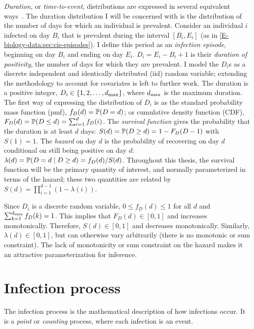 \documentclass[thesis.tex]{subfiles}
\begin{document}
\emph{Duration}, or \emph{time-to-event}, distributions are expressed in several equivalent ways~\autocite[17]{sunStatisticala}.
The duration distribution I will be concerned with is the distribution of the number of days for which an individual is prevalent.
Consider an individual $i$ infected on day $B_i$ that is prevalent during the interval $[B_i, E_i]$ (as in \cref{E-biology-data:sec:cis-episodes}).
I define this period as an \emph{infection episode}, beginning on day $B_i$ and ending on day $E_i$.
$D_i = E_i - B_i + 1$ is their \emph{duration of positivity}, the number of days for which they are prevalent.
I model the $D_i$s as a discrete independent and identically distributed (iid) random variable; extending the methodology to account for covariates is left to further work.
The duration is a positive integer, \ie $D_i \in \{1, 2, \dots, d_\text{max} \}$, where $d_\text{max}$ is the maximum duration.
The first way of expressing the distribution of $D_i$ is as the standard probability mass function (pmf), $f_{D}(d) = \operatorname{\mathbb{P}}(D = d)$; or cumulative density function (CDF), $F_{D}(d) = \operatorname{\mathbb{P}}(D \leq d) = \sum_{i=1}^d f_{D}(i)$.
The \emph{survival function} gives the probability that the duration is at least $d$ days: $S(d) = \operatorname{\mathbb{P}}(D \geq d) = 1 - F_{D}(D - 1)$ with $S(1) = 1$.
The \emph{hazard} on day $d$ is the probability of recovering on day $d$ conditional on still being positive on day $d$: $\lambda(d) = \operatorname{\mathbb{P}}(D = d \mid D \geq d) = f_{D}(d) / S(d)$.
Throughout this thesis, the survival function will be the primary quantity of interest, and normally parameterized in terms of the hazard; these two quantities are related by $S(d) = \prod_{i=1}^{d-1} (1 - \lambda(i))$.

Since $D_i$ is a discrete random variable, $0 \leq f_D(d) \leq 1$ for all $d$ and $\sum_{k=1}^{d_\text{max}} f_D(k) = 1$.
This implies that $F_D(d) \in [0, 1]$ and increases monotonically.
Therefore, $S(d) \in [0, 1]$ and decreases monotonically.
Similarly, $\lambda(d) \in [0,1]$, but can otherwise vary arbitrarily (\ie there is no monotonic or sum constraint).
The lack of monotonicity or sum constraint on the hazard makes it an attractive parameterization for inference.

\section{Infection process} \label{inc-prev:sec:infection-process}
The infection process is the mathematical description of how infections occur.
It is a \emph{point} or \emph{counting} process, where each infection is an event.
\end{document}
